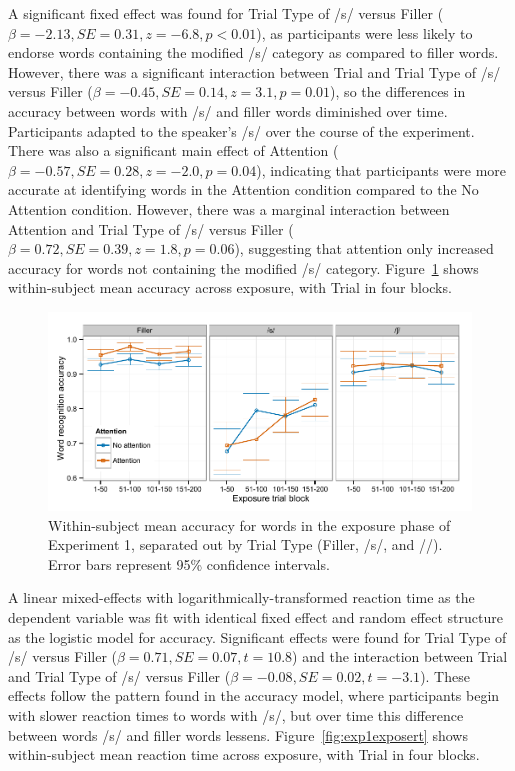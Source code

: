 A significant fixed effect was found for Trial Type of /s/ versus Filler ($\beta = -2.13, SE = 0.31, z = -6.8, p < 0.01$), as participants were less likely to endorse words containing the modified /s/ category as compared to filler words.
However, there was a significant interaction between Trial and Trial Type of /s/ versus Filler ($\beta = -0.45, SE = 0.14, z = 3.1, p = 0.01$), so the differences in accuracy between words with /s/ and filler words diminished over time.
Participants adapted to the speaker's /s/ over the course of the experiment.
There was also a significant main effect of Attention ($\beta = -0.57, SE = 0.28, z = -2.0, p = 0.04$), indicating that participants were more accurate at identifying words in the Attention condition compared to the No Attention condition.
However, there was a marginal interaction between Attention and Trial Type of /s/ versus Filler ($\beta = 0.72, SE = 0.39, z = 1.8, p = 0.06$), suggesting that attention only increased accuracy for words not containing the modified /s/ category.
Figure~\ref{fig:exp1exposeacc} shows within-subject mean accuracy across exposure, with Trial in four blocks.

\begin{figure}[!ht]
\caption{Within-subject mean accuracy for words in the exposure phase of Experiment 1, separated out by Trial Type (Filler, /s/, and /\textesh/). Error bars represent 95\% confidence intervals.}
\label{fig:exp1exposeacc}
\begin{center}
\includegraphics[width=\textwidth]{graphs/exp1_expacc}
\end{center}
\end{figure}

A linear mixed-effects with logarithmically-transformed reaction time as the dependent variable was fit with identical fixed effect and random effect structure as the logistic model for accuracy.
Significant effects were found for Trial Type of /s/ versus Filler ($\beta = 0.71, SE = 0.07, t = 10.8$) and the interaction between Trial and Trial Type of /s/ versus Filler ($\beta = -0.08, SE = 0.02, t = -3.1$).  
These effects follow the pattern found in the accuracy model, where participants begin with slower reaction times to words with /s/, but over time this difference between words /s/ and filler words lessens.  
Figure~\ref{fig:exp1exposert} shows within-subject mean reaction time across exposure, with Trial in four blocks.

